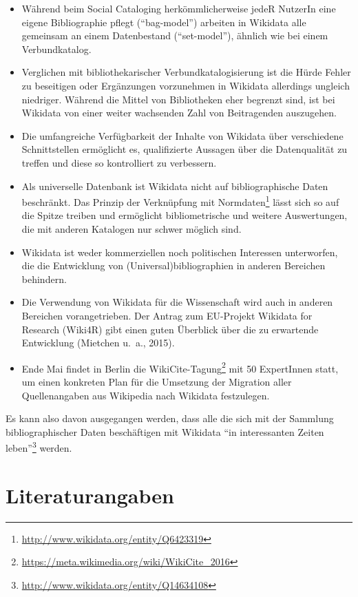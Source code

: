 \documentclass[a4paper,
fontsize=11pt,
oneside,
numbers=noperiodatend,
parskip=half-,
bibliography=totoc,
final
]{scrartcl}
\begin{document}
\begin{itemize}
\item
  Während beim Social Cataloging herkömmlicherweise jedeR NutzerIn eine
  eigene Bibliographie pflegt (\enquote{bag-model}) arbeiten in Wikidata
  alle gemeinsam an einem Datenbestand (\enquote{set-model}), ähnlich
  wie bei einem Verbundkatalog.
\item
  Verglichen mit bibliothekarischer Verbundkatalogisierung ist die Hürde
  Fehler zu beseitigen oder Ergänzungen vorzunehmen in Wikidata
  allerdings ungleich niedriger. Während die Mittel von Bibliotheken
  eher begrenzt sind, ist bei Wikidata von einer weiter wachsenden Zahl
  von Beitragenden auszugehen.
\item
  Die umfangreiche Verfügbarkeit der Inhalte von Wikidata über
  verschiedene Schnittstellen ermöglicht es, qualifizierte Aussagen über
  die Datenqualität zu treffen und diese so kontrolliert zu verbessern.
\item
  Als universelle Datenbank ist Wikidata nicht auf bibliographische
  Daten beschränkt. Das Prinzip der Verknüpfung mit Normdaten\footnote{\url{http://www.wikidata.org/entity/Q6423319}}
  lässt sich so auf die Spitze treiben und ermöglicht bibliometrische
  und weitere Auswertungen, die mit anderen Katalogen nur schwer möglich
  sind.
\item
  Wikidata ist weder kommerziellen noch politischen Interessen
  unterworfen, die die Entwicklung von (Universal)bibliographien in
  anderen Bereichen behindern.
\item
  Die Verwendung von Wikidata für die Wissenschaft wird auch in anderen
  Bereichen vorangetrieben. Der Antrag zum EU-Projekt Wikidata for
  Research (Wiki4R) gibt einen guten Überblick über die zu erwartende
  Entwicklung (Mietchen u.~a., 2015).
\item
  Ende Mai findet in Berlin die WikiCite-Tagung\footnote{\url{https://meta.wikimedia.org/wiki/WikiCite_2016}}
  mit 50 ExpertInnen statt, um einen konkreten Plan für die Umsetzung
  der Migration aller Quellenangaben aus Wikipedia nach Wikidata
  festzulegen.
\end{itemize}

Es kann also davon ausgegangen werden, dass alle die sich mit der
Sammlung bibliographischer Daten beschäftigen mit Wikidata \enquote{in
interessanten Zeiten leben}\footnote{\url{http://www.wikidata.org/entity/Q14634108}}
werden.

\section*{Literaturangaben}\label{literaturangaben}
\end{document}
